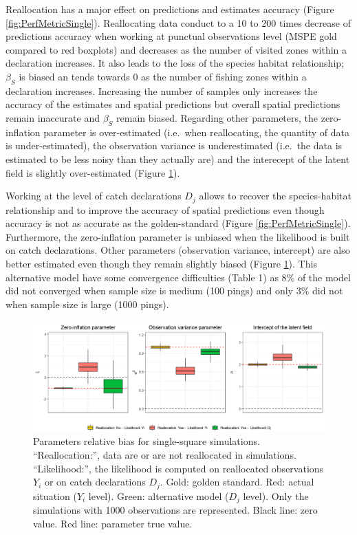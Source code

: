 \documentclass[
  english,
  man]{apa6}
\begin{document}
Reallocation has a major effect on predictions and estimates accuracy (Figure \ref{fig:PerfMetricSingle}). Reallocating data conduct to a 10 to 200 times decrease of predictions accuracy when working at punctual observations level (MSPE gold compared to red boxplots) and decreases as the number of visited zones within a declaration increases. It also leads to the loss of the species habitat relationship; \(\beta_S\) is biased an tends towards 0 as the number of fishing zones within a declaration increases. Increasing the number of samples only increases the accuracy of the estimates and spatial predictions but overall spatial predictions remain inaccurate and \(\beta_S\) remain biased. Regarding other parameters, the zero-inflation parameter is over-estimated (i.e.~when reallocating, the quantity of data is under-estimated), the observation variance is underestimated (i.e.~the data is estimated to be less noisy than they actually are) and the interecept of the latent field is slightly over-estimated (Figure \ref{fig:ParBiasSingle}).

Working at the level of catch declarations \(D_j\) allows to recover the species-habitat relationship and to improve the accuracy of spatial predictions even though accuracy is not as accurate as the golden-standard (Figure \ref{fig:PerfMetricSingle}). Furthermore, the zero-inflation parameter is unbiased when the likelihood is built on catch declarations. Other parameters (observation variance, intercept) are also better estimated even though they remain slightly biased (Figure \ref{fig:ParBiasSingle}). This alternative model have some convergence difficulties (Table 1) as 8\% of the model did not converged when sample size is medium (100 pings) and only 3\% did not when sample size is large (1000 pings).

\begin{figure}
\centering
\includegraphics{images/par_plot_single_square.png}
\caption{\label{fig:ParBiasSingle} Parameters relative bias for single-square simulations. \enquote{Reallocation:}, data are or are not reallocated in simulations. \enquote{Likelihood:}, the likelihood is computed on reallocated observations \(Y_i\) or on catch declarations \(D_j\). Gold: golden standard. Red: actual situation (\(Y_i\) level). Green: alternative model (\(D_j\) level). Only the simulations with 1000 observations are represented. Black line: zero value. Red line: parameter true value.}
\end{figure}
\end{document}
